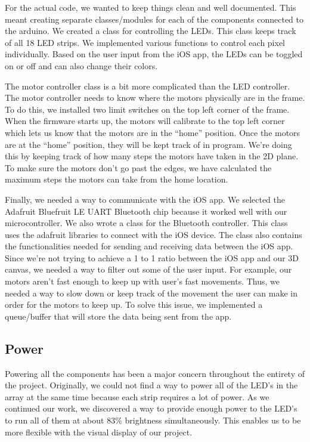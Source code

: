\documentclass[11pt]{IEEEtran}
\begin{document}
For the actual code, we wanted to keep things clean and well documented. This meant creating separate classes/modules for each of the components connected to the arduino. We created a class for controlling the LEDs. This class keeps track of all 18 LED strips. We implemented various functions to control each pixel individually. Based on the user input from the iOS app, the LEDs can be toggled on or off and can also change their colors.

The motor controller class is a bit more complicated than the LED controller. The motor controller needs to know where the motors physically are in the frame. To do this, we installed two limit switches on the top left corner of the frame. When the firmware starts up, the motors will calibrate to the top left corner which lets us know that the motors are in the “home” position. Once the motors are at the “home” position, they will be kept track of in program. We’re doing this by keeping track of how many steps the motors have taken in the 2D plane. To make sure the motors don’t go past the edges, we have calculated the maximum steps the motors can take from the home location. 

Finally, we needed a way to communicate with the iOS app. We selected the Adafruit Bluefruit LE UART Bluetooth chip because it worked well with our microcontroller. We also wrote a class for the Bluetooth controller. This class uses the adafruit libraries to connect with the iOS device. The class also contains the functionalities needed for sending and receiving data between the iOS app. Since we’re not trying to achieve a 1 to 1 ratio between the iOS app and our 3D canvas, we needed a way to filter out some of the user input. For example, our motors aren’t fast enough to keep up with user’s fast movements. Thus, we needed a way to slow down or keep track of the movement the user can make in order for the motors to keep up. To solve this issue, we implemented a queue/buffer that will store the data being sent from the app.

\subsection{Power}
Powering all the components has been a major concern throughout the entirety of the project. Originally, we could not find a way to power all of the LED’s in the array at the same time because each strip requires a lot of power. As we continued our work, we discovered a way to provide enough power to the LED’s to run all of them at about 83\% brightness simultaneously. This enables us to be more flexible with the visual display of our project. 
\end{document}
